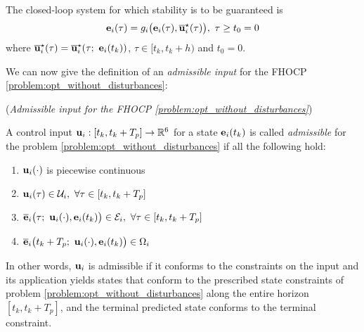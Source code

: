 The closed-loop system for which stability is to be guaranteed is
\begin{align}
  \bm{\mathbf{e}}_i(\tau) = g_i\big(\bm{\mathbf{e}}_i(\tau), \overline{\bm{\mathbf{u}}}_i^{\star}(\tau)\big),\ \tau \geq t_0 = 0
  \label{eq:without_disturbances_closed_loop}
\end{align}
where $\overline{\bm{\mathbf{u}}}_i^{\star}(\tau) = \overline{\bm{\mathbf{u}}}_i^{\star}(\tau;\ \bm{\mathbf{e}}_i(t_k))$,
$\tau \in [t_k, t_k + h)$ and $t_0 = 0$.


We can now give the definition of an \textit{admissible input} for the FHOCP
\eqref{problem:opt_without_disturbances}:

\begin{bw_box}
  \begin{definition} (\textit{Admissible input for the FHOCP
\eqref{problem:opt_without_disturbances}})
  \label{definition:admissible_input}

  A control input $\bm{\mathbf{u}}_i : [t_k, t_k + T_p] \to \mathbb{R}^6$ for a state
  $\bm{\mathbf{e}}_i(t_k)$ is called \textit{admissible} for the problem
  \eqref{problem:opt_without_disturbances} if all the following hold:

  \begin{enumerate}
    \item $\bm{\mathbf{u}}_i(\cdot)$ is piecewise continuous
    \item $\vect{u}_i(\tau) \in \mathcal{U}_i,\ \forall \tau \in [t_k, t_k + T_p]$
    \item $\overline{\vect{e}}_i\big(\tau;\ \vect{u}_i(\cdot), \vect{e}_i(t_k)\big) \in \mathcal{E}_i,\ \forall \tau \in [t_k, t_k + T_p]$
    \item $\overline{\vect{e}}_i\big(t_k + T_p;\ \vect{u}_i(\cdot), \vect{e}_i(t_k)\big) \in \Omega_i$
  \end{enumerate}

  In other words, $\bm{\mathbf{u}}_i$ is admissible if it conforms to the constraints
  on the input and its application yields states that conform to the
  prescribed state constraints of problem
  \eqref{problem:opt_without_disturbances} along the entire horizon
  $[t_k, t_k + T_p]$, and the terminal predicted state conforms to the
  terminal constraint.

\end{definition}
\end{bw_box}
